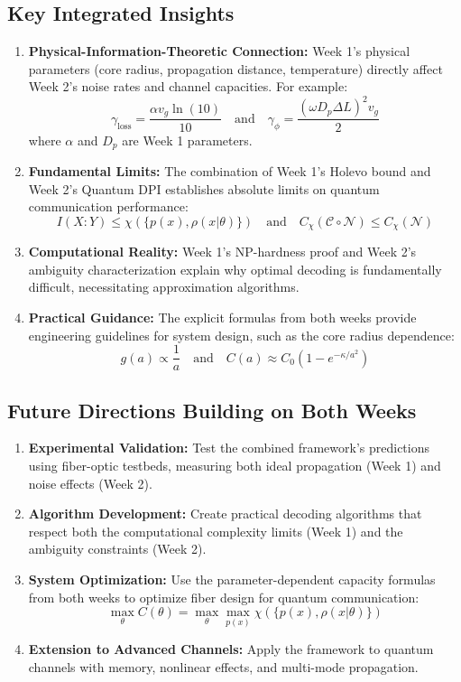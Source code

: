 \documentclass[12pt,a4paper]{article}
\begin{document}
\subsection{Key Integrated Insights}
\begin{enumerate}
    \item \textbf{Physical-Information-Theoretic Connection:} Week 1's physical parameters (core radius, propagation distance, temperature) directly affect Week 2's noise rates and channel capacities. For example:
    \[
    \gamma_{\text{loss}} = \frac{\alpha v_g \ln(10)}{10} \quad \text{and} \quad \gamma_\phi = \frac{(\omega D_p \Delta L)^2 v_g}{2}
    \]
    where $\alpha$ and $D_p$ are Week 1 parameters.
    
    \item \textbf{Fundamental Limits:} The combination of Week 1's Holevo bound and Week 2's Quantum DPI establishes absolute limits on quantum communication performance:
    \[
    I(X:Y) \leq \chi(\{p(x), \rho(x|\theta)\}) \quad \text{and} \quad C_\chi(\mathcal{C} \circ \mathcal{N}) \leq C_\chi(\mathcal{N})
    \]
    
    \item \textbf{Computational Reality:} Week 1's NP-hardness proof and Week 2's ambiguity characterization explain why optimal decoding is fundamentally difficult, necessitating approximation algorithms.
    
    \item \textbf{Practical Guidance:} The explicit formulas from both weeks provide engineering guidelines for system design, such as the core radius dependence:
    \[
    g(a) \propto \frac{1}{a} \quad \text{and} \quad C(a) \approx C_0\left(1 - e^{-\kappa/a^2}\right)
    \]
\end{enumerate}

\subsection{Future Directions Building on Both Weeks}
\begin{enumerate}
    \item \textbf{Experimental Validation:} Test the combined framework's predictions using fiber-optic testbeds, measuring both ideal propagation (Week 1) and noise effects (Week 2).
    
    \item \textbf{Algorithm Development:} Create practical decoding algorithms that respect both the computational complexity limits (Week 1) and the ambiguity constraints (Week 2).
    
    \item \textbf{System Optimization:} Use the parameter-dependent capacity formulas from both weeks to optimize fiber design for quantum communication:
    \[
    \max_{\theta} C(\theta) = \max_{\theta} \max_{p(x)} \chi(\{p(x), \rho(x|\theta)\})
    \]
    
    \item \textbf{Extension to Advanced Channels:} Apply the framework to quantum channels with memory, nonlinear effects, and multi-mode propagation.
\end{enumerate}
\end{document}
